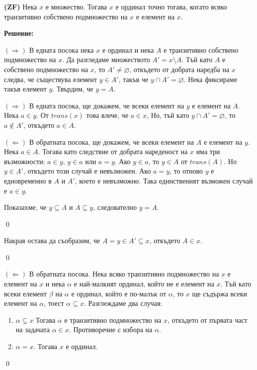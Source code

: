 \begin{problem}
\textbf{(ZF)}
Нека $x$ е множество. Тогава $x$ е ординал точно тогава,
когато всяко транзитивно собствено подмножество на $x$ е елемент на $x$.
\end{problem}

\textbf{Решение:}

\smallbreak
\quad
$(\Rightarrow)$
В едната посока нека $x$ е ординал и нека $A$ е транзитивно собствено подмножество на $x$.
Да разгледаме множеството $A' = x \setminus A$.
Тъй като $A$ е собствено подмножество на $x$, то $A' \neq \varnothing$,
откъдето от добрата наредба на $x$ следва, че съществува елемент $y \in A'$, такъв че $y \cap A' = \varnothing$.
Нека фиксираме такъв елемент $y$.
Твърдим, че $y = A$.

\begin{tcolorbox}[mybox={Доказателство:}]
\quad
$(\Rightarrow)$ В едната посока, ще докажем, че всеки елемент на $y$ е елемент на $A$.
Нека $a \in y$. От $trans(x)$ това влече, че $a \in x$,
Но, тъй като $y \cap A' = \varnothing$, то $a \notin A'$, откъдето $a \in A$.

\quad
$(\Leftarrow)$ В обратната посока, ще докажем, че всеки елемент на $A$ е елемент на $y$.
Нека $a \in A$. Тогава като следствие от добрата нареденост на $x$ има три възможности:
$a \in y$, $y \in a$ или $a = y$.
Ако $y \in a$, то $y \in A$ от $trans(A)$.
Но $y \in A'$, откъдето този случай е невъзможен.
Ако $a = y$, то отново $y$ е едновременно в $A$ и $A'$, което е невъзможно.
Така единственият възможен случай е $a \in y$.

\quad
Показахме, че $y \subseteq A$ и $A \subseteq y$, следователно $y = A$.

\qed
\end{tcolorbox}

\quad
Накрая остава да съобразим, че $A = y \in A' \subseteq x$, откъдето $A \in x$.

\qed


\quad
$(\Leftarrow)$ В обратната посока.
Нека всяко транзитивно подмножество на $x$ е елемент на $x$
и нека $\alpha$ е най-малкият ординал, който не е елемент на $x$.
Тъй като всеки елемент $\beta$ на $\alpha$ е ординал, който е по-малък от $\alpha$,
то $x$ ще съдържа всеки елемент на $\alpha$, тоест $\alpha \subseteq x$.
Разглеждаме два случая:
\begin{enumerate}
\item
$\alpha \subsetneq x$
Тогава $\alpha$ е транзитивно подмножество на $x$, откъдето от първата част на задачата $\alpha \in x$.
Противоречие с избора на $\alpha$.

\item
$\alpha = x$. Тогава $x$ е ординал.
\end{enumerate}

\qed

